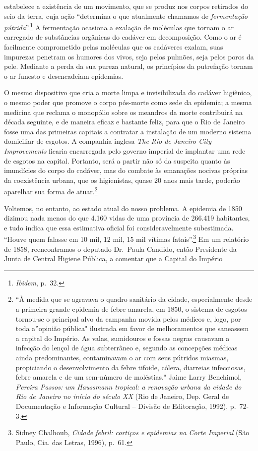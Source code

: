 estabelece a existência de um movimento, que se produz nos corpos
retirados do seio da terra, cuja ação ``determina o que atualmente
chamamos de \emph{fermentação pútrida}''.\footnote{\emph{Ibidem}, p.~32.}
A fermentação ocasiona a exalação de moléculas que tornam o ar carregado
de substâncias orgânicas do cadáver em decomposição. Como o ar é
facilmente comprometido pelas moléculas que os cadáveres exalam, suas
impurezas penetram os humores dos vivos, seja pelos pulmões, seja pelos
poros da pele. Mediante a perda da sua pureza natural, os princípios da
putrefação tornam o ar funesto e desencadeiam epidemias.

O mesmo dispositivo que cria a morte limpa e invisibilizada do cadáver
higiênico, o mesmo poder que promove o corpo pós-morte como sede da
epidemia; a mesma medicina que reclama o monopólio sobre os meandros da
morte contribuirá na década seguinte, e de maneira eficaz e bastante
feliz, para que o Rio de Janeiro fosse uma das primeiras capitais a
contratar a instalação de um moderno sistema domiciliar de esgotos. A
companhia inglesa \emph{The Rio de Janeiro City Improvements} ficaria
encarregada pelo governo imperial de implantar uma rede de esgotos na
capital. Portanto, será a partir não só da suspeita quanto às imundícies
do corpo do cadáver, mas do combate às emanações nocivas próprias da
coexistência urbana, que os higienistas, quase 20 anos mais tarde,
poderão aparelhar sua forma de atuar.\footnote{``À medida que se
  agravava o quadro sanitário da cidade, especialmente desde a primeira
  grande epidemia de febre amarela, em 1850, o sistema de esgotos
  tornou-se o principal alvo da campanha movida pelos médicos e, logo,
  por toda a''opinião pública" ilustrada em favor de melhoramentos que
  saneassem a capital do Império. As valas, sumidouros e fossas negras
  causavam a infecção do lençol de água subterrâneo e, segundo as
  concepções médicas ainda predominantes, contaminavam o ar com seus
  pútridos miasmas, propiciando o desenvolvimento da febre tifoide,
  cólera, diarreias infecciosas, febre amarela e de um sem-número de
  moléstias." Jaime Larry Benchimol, \emph{Pereira Passos: um Haussmann
  tropical: a renovação urbana da cidade do Rio de Janeiro no início do
  século XX} (Rio de Janeiro, Dep. Geral de Documentação e Informação
  Cultural -- Divisão de Editoração, 1992), p.~72-3.}

Voltemos, no entanto, ao estado atual do nosso problema. A epidemia de
1850 dizimou nada menos do que 4.160 vidas de uma província de 266.419
habitantes, e tudo indica que essa estimativa oficial foi
consideravelmente subestimada. ``Houve quem falasse em 10 mil, 12 mil,
15 mil vítimas fatais''.\footnote{Sidney Chalhoub, \emph{Cidade febril:
  cortiços e epidemias na Corte Imperial} (São Paulo, Cia. das Letras,
  1996), p.~61.} Em um relatório de 1858, reencontramos o deputado
Dr.~Paula Candido, então Presidente da Junta de Central Higiene Pública,
a comentar que a Capital do Império

